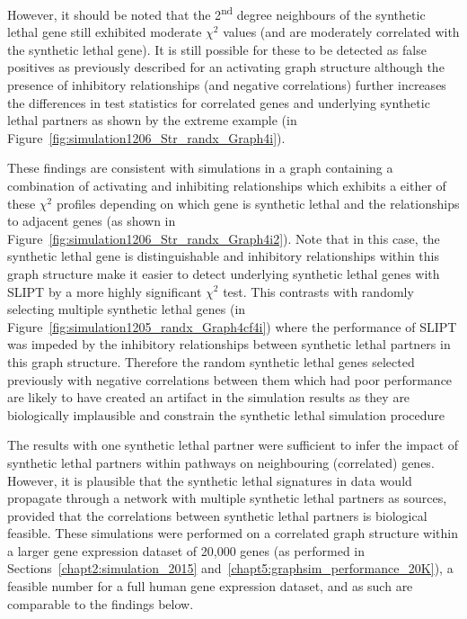 
However, it should be noted that the 2\textsuperscript{nd} degree neighbours of the \gls{synthetic lethal} gene still exhibited moderate $\chi^2$ values (and are moderately correlated with the \gls{synthetic lethal} gene). It is still possible for these to be detected as false positives as previously described for an activating \gls{graph} structure although the presence of inhibitory relationships (and negative correlations) further increases the differences in test statistics for correlated genes and underlying \gls{synthetic lethal} partners as shown by the extreme example (in Figure~\ref{fig:simulation1206_Str_randx_Graph4i}).

These findings are consistent with simulations in a graph containing a combination of activating and inhibiting relationships which exhibits a either of these $\chi^2$ profiles depending on which gene is \gls{synthetic lethal} and the relationships to adjacent genes (as shown in Figure~\ref{fig:simulation1206_Str_randx_Graph4i2}). Note that in this case, the \gls{synthetic lethal} gene is distinguishable and inhibitory relationships within this \gls{graph} structure make it easier to detect underlying \gls{synthetic lethal} genes with \gls{SLIPT} by a more highly significant $\chi^2$ test. This contrasts with randomly selecting multiple \gls{synthetic lethal} genes (in Figure~\ref{fig:simulation1205_randx_Graph4cf4i}) where the performance of \gls{SLIPT} was impeded by the inhibitory relationships between \gls{synthetic lethal} partners in this \gls{graph} structure. Therefore the random \gls{synthetic lethal} genes selected previously with negative correlations between them which had poor performance are likely to have created an artifact in the simulation results as they are biologically implausible and constrain the \gls{synthetic lethal} simulation procedure

The results with one \gls{synthetic lethal} partner were sufficient to infer the impact of \gls{synthetic lethal} partners within pathways on neighbouring (correlated) genes. However,  it is plausible that the \gls{synthetic lethal} signatures in  data would propagate through a network with multiple \gls{synthetic lethal} partners as sources, provided that the correlations between \gls{synthetic lethal} partners is biological feasible. These simulations were performed on a correlated \gls{graph} structure within a larger \gls{gene expression} dataset of 20,000 genes (as performed in Sections~\ref{chapt2:simulation_2015} and~\ref{chapt5:graphsim_performance_20K}), a feasible number for a full human \gls{gene expression} dataset, and as such are comparable to the findings below.

